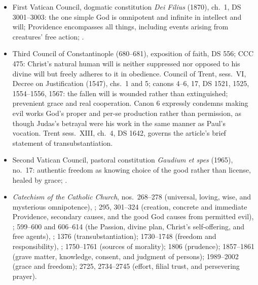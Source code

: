 {\fontsize{8.6}{9.6}\selectfont
\begin{itemize}[itemsep=0pt,parsep=0pt,topsep=0.05em]
\item First Vatican Council, dogmatic constitution \emph{Dei Filius} (1870), ch.~1, DS 3001--3003: the one simple God is omnipotent and infinite in intellect and will; Providence encompasses all things, including events arising from creatures' free action; .
\item Third Council of Constantinople (680--681), exposition of faith, DS 556; CCC 475: Christ's natural human will is neither suppressed nor opposed to his divine will but freely adheres to it in obedience. Council of Trent, sess.~VI, Decree on Justification (1547), chs.~1 and 5; canons 4--6, 17, DS 1521, 1525, 1554--1556, 1567: the fallen will is wounded rather than extinguished; prevenient grace and real cooperation. Canon 6 expressly condemns making evil works God's proper and per-se production rather than permission, as though Judas's betrayal were his work in the same manner as Paul's vocation. Trent sess.~XIII, ch.~4, DS 1642, governs the article's brief statement of transubstantiation.
\item Second Vatican Council, pastoral constitution \emph{Gaudium et spes} (1965), no.~17: authentic freedom as knowing choice of the good rather than license, healed by grace; .
\item \emph{Catechism of the Catholic Church}, nos.~268--278 (universal, loving, wise, and mysterious omnipotence), ; 295, 301--324 (creation, concrete and immediate Providence, secondary causes, and the good God causes from permitted evil), ; 599--600 and 606--614 (the Passion, divine plan, Christ's self-offering, and free agents), ; 1376 (transubstantiation); 1730--1748 (freedom and responsibility), ; 1750--1761 (sources of morality); 1806 (prudence); 1857--1861 (grave matter, knowledge, consent, and judgment of persons); 1989--2002 (grace and freedom); 2725, 2734--2745 (effort, filial trust, and persevering prayer).

\end{itemize}}
